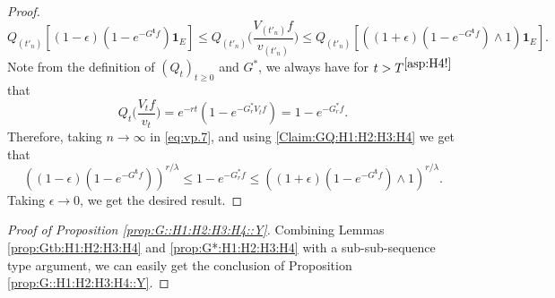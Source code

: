 \documentclass[12pt,a4paper]{amsart}
\numberwithin{equation}{section}
\theoremstyle{plain}
\theoremstyle{definition}
\theoremstyle{remark}
\begin{document}
\begin{proof}
\begin{equation}
	Q_{(t'_n)}[ (1-\epsilon) (1-e^{-G^{\mathbf t}f}) \mathbf 1_E ]
	\leq Q_{(t'_n)}\Big( \frac{V_{(t'_n)}f}{v_{(t'_n)}} \Big)
	\leq Q_{(t'_n)}[ ( (1+\epsilon) (1-e^{-G^{\mathbf t}f}) \wedge 1)  \mathbf 1_E ].
\end{equation}
	Note from the definition of $(Q_t)_{t\geq 0}$ and $G^*$, we always have for $t>T^{\eqref{asp:H4!}}$ that
\[
	Q_t \Big( \frac{V_tf}{v_t}  \Big)
	= e^{- r t}( 1 - e^{- G_r^*V_tf}  )
	= 1- e^{- G_r^* f}.
\]
	Therefore, taking $n \to \infty$ in \eqref{eq:vp.7}, and using \eqref{Claim:GQ:H1:H2:H3:H4}  we get that
\[
	\left((1 - \epsilon) (1 - e^{- G^{\mathbf t}f})\right)^{r/\lambda}
	\leq 1 - e^{- G_r^* f}
	\leq \left((1 + \epsilon) (1 - e^{- G^{\mathbf t} f})\wedge 1 \right)^{r/\lambda}.
\]
	Taking $\epsilon \to 0$, we get the desired result.
\end{proof}

\begin{proof}[Proof of Proposition \ref{prop:G::H1:H2:H3:H4::Y}]
	Combining  Lemmas \ref{prop:Gtb:H1:H2:H3:H4} and \ref{prop:G*:H1:H2:H3:H4} with a sub-sub-sequence type argument, we can easily get the conclusion of Proposition \ref{prop:G::H1:H2:H3:H4::Y}. 
\end{proof}
\end{document}

